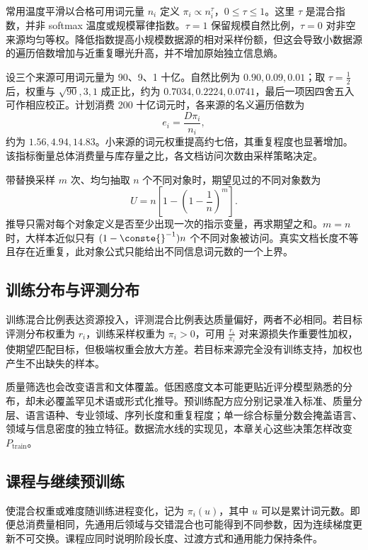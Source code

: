 \documentclass[../textbook.tex]{subfiles}
\begin{document}
常用温度平滑以合格可用词元量 $n_i$ 定义 $\pi_i\propto n_i^\tau$，$0\le\tau\le1$。这里 $\tau$ 是混合指数，并非 softmax 温度或规模幂律指数。$\tau=1$ 保留规模自然比例，$\tau=0$ 对非空来源均匀等权。降低指数提高小规模数据源的相对采样份额，但这会导致小数据源的遍历倍数增加与近重复曝光升高，并不增加原始独立信息熵。

\begin{example}[数据混合配比]
设三个来源可用词元量为 90、9、1 十亿。自然比例为 $0.90,0.09,0.01$；取 $\tau=\frac{1}{2}$ 后，权重与 $\sqrt{90},3,1$ 成正比，约为 $0.7034,0.2224,0.0741$，最后一项因四舍五入可作相应校正。计划消费 200 十亿词元时，各来源的名义遍历倍数为
\begin{equation}
 e_i=\frac{D\pi_i}{n_i},
\end{equation}
约为 $1.56,4.94,14.83$。小来源的词元权重提高约七倍，其重复程度也显著增加。该指标衡量总体消费量与库存量之比，各文档访问次数由采样策略决定。

带替换采样 $m$ 次、均匀抽取 $n$ 个不同对象时，期望见过的不同对象数为
\begin{equation}\label{eq:pt-unique}
 U=n\left[1-\left(1-\frac1n\right)^m\right].
\end{equation}
推导只需对每个对象定义是否至少出现一次的指示变量，再求期望之和。$m=n$ 时，大样本近似只有 $(1-\conste{}^{-1})n$ 个不同对象被访问。真实文档长度不等且存在近重复，此对象公式只能给出不同信息词元数的一个上界。
\end{example}

\subsection{训练分布与评测分布}
训练混合比例表达资源投入，评测混合比例表达质量偏好，两者不必相同。若目标评测分布权重为 $r_i$，训练采样权重为 $\pi_i>0$，可用 $\frac{r_i}{\pi_i}$ 对来源损失作重要性加权，使期望匹配目标，但极端权重会放大方差。若目标来源完全没有训练支持，加权也产生不出缺失的样本。

质量筛选也会改变语言和文体覆盖。低困惑度文本可能更贴近评分模型熟悉的分布，却未必覆盖罕见术语或形式化推导。预训练配方应分别记录准入标准、质量分层、语言语种、专业领域、序列长度和重复程度；单一综合标量分数会掩盖语言、领域与信息密度的独立特征。数据流水线的实现见，本章关心这些决策怎样改变 $P_{\mathrm{train}}$。

\subsection{课程与继续预训练}
使混合权重或难度随训练进程变化，记为 $\pi_i(u)$，其中 $u$ 可以是累计词元数。即便总消费量相同，先通用后领域与交错混合也可能得到不同参数，因为连续梯度更新不可交换。课程应同时说明阶段长度、过渡方式和通用能力保持条件。
\end{document}

